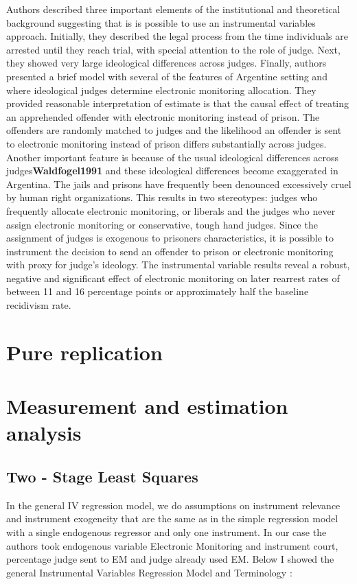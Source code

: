 \documentclass[a4paper,12pt]{article}
\begin{document}
Authors described three important elements of the institutional and theoretical background suggesting that is is possible to use an instrumental variables approach. Initially, they described the legal process from the time individuals are arrested until they reach trial, with special attention to the role of judge. Next, they showed very large ideological differences across judges. Finally, authors presented a brief model with several of the features of Argentine setting and where ideological judges determine electronic monitoring allocation.    
They provided reasonable interpretation of estimate is that the causal effect of treating an apprehended offender with electronic monitoring instead of prison. The offenders are randomly matched to judges and the likelihood an offender is sent to electronic monitoring instead of prison differs substantially across judges. Another important feature is because of the usual ideological differences across judges\textbf{Waldfogel1991}\cite{Waldfogel91} and these ideological differences become exaggerated in Argentina. The jails and prisons have frequently been denounced excessively cruel by human right organizations. This results in two stereotypes: judges who frequently allocate electronic monitoring, or liberals and the judges who never assign electronic monitoring or conservative, tough hand judges. Since the assignment of judges is exogenous to prisoners characteristics, it is possible to instrument the decision to send an offender to prison or electronic monitoring with proxy for judge's ideology. The instrumental variable results reveal a robust, negative and significant effect of electronic monitoring on later rearrest rates of between 11 and 16 percentage points or approximately half the baseline recidivism rate.   




\newpage
\section{Pure replication}

\newpage
\section{Measurement and estimation analysis}
\subsection{Two - Stage Least Squares}

In the general IV regression model, we do assumptions  on instrument relevance and instrument exogeneity that are the same as in the simple regression model with a single endogenous regressor and only one instrument. In our case the authors took endogenous variable Electronic Monitoring and instrument court, percentage judge sent to EM and judge already used EM. Below I showed the general Instrumental Variables Regression Model and Terminology : 
\end{document}
